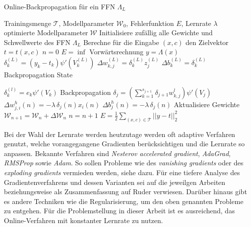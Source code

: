 \begin{algorithm}[h]
    \caption{Online-Backpropagation für ein FFN $\Lambda_L$}
    \label{alg:online_backprop}
    \begin{algorithmic}
    \Require  Trainingsmenge $\mathcal{T}$, Modellparameter $\mathcal{W}_0$, Fehlerfunktion $E$, Lernrate $\lambda$ 
    \Ensure $\text{optimierte Modellparameter} \; \mathcal{W}$
    \State Initialisiere zufällig alle Gewichte und Schwellwerte des FFN $\Lambda_L$ 
    \State Berechne für die Eingabe $(x,c)$ den Zielvektor $t=t(x,c)$
    \State $n=0$  
    \State $E=\inf$
     
        \State Vorwärtsrechnung $y=\Lambda(x)$
            \State $\delta_k^{(L)}=(y_k-t_k) \psi'(V^{(L)}_k)$
                \State $\Delta w_{k,j}^{(L)}= \delta_k^{(L)} z^{(L)}_j$
                \State $\Delta b_{k}^{(L)}=  \delta_k^{(L)}$
            \EndFor
        \EndFor
        \State Backpropagation
             State

        \EndFor    
        \State $\delta^{(l)}_k= e_k \psi'(V_k)$
        \State Backpropagation
            \State $\delta_j= \left(\sum_{k=1}^{s_{j+1}} \delta_{j+1} w_{k,j}^l\right) \psi'(V_j)$
            \State $\Delta w_{j,i}^h(n)= -\lambda \, \delta_j(n) x_i(n)$
            \State $\Delta b_{j}^h(n)= -\lambda \, \delta_j(n)$
        \EndFor
        \State Aktualisiere Gewichte 
        \State $\mathcal{W}_{n+1}= \mathcal{W}_n + \Delta \mathcal{W}_n$
        \State $n=n+1$
    \EndFor
    \State $E=\frac{1}{2} \sum_{(x,c) \in \mathcal{T}} ||y-t||_2^2$
    \EndWhile
    \end{algorithmic}
\end{algorithm}


Bei der Wahl der Lernrate werden heutzutage werden oft adaptive Verfahren genutzt, welche vorangegangene Gradienten berücksichtigen und die Lernrate so anpassen. Bekannte Verfahren sind \textit{Nesterov accelerated
gradient}\cite{sutskever2013importance}, \textit{AdaGrad}\cite{duchi2011adaptive}, \textit{RMSProp}\cite{tieleman2012lecture} sowie \textit{Adam}\cite{Kingma2015AdamAM}. So sollen Probleme wie des \textit{vanishing gradients} oder des \textit{exploding gradients} vermieden werden, siehe dazu\cite{hanin2018neural}.
Für eine tiefere Analyse des Gradientenverfahrens und dessen Varianten sei auf die jeweilgen Arbeiten beziehungsweise als Zusammenfassung auf Ruder\cite{ruder2016overview,} verwiesen. Darüber hinaus gibt es andere Techniken wie die Regularisierung, um den oben genannten Probleme zu entgehen.
Für die Problemstellung in dieser Arbeit ist es ausreichend, das Online-Verfahren mit konstanter Lernrate zu nutzen. 

